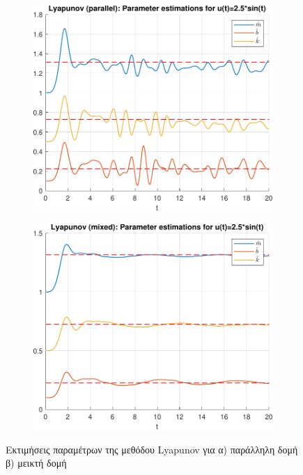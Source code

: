 \documentclass[a4paper,12pt]{article}
\begin{document}
\begin{figure}[h!]
    \centering
    \begin{subfigure}{0.45\textwidth}
        \centering
        \includegraphics[width=\linewidth]{plot/task1_parameter_estimations_lyapunov_parallel.pdf}
        \caption{}
        \label{fig:task1_parameter_estimations_lyapunov_parallel}
    \end{subfigure}
    \hfill
    \begin{subfigure}{0.45\textwidth}
        \centering
        \includegraphics[width=\linewidth]{plot/task1_parameter_estimations_lyapunov_mixed.pdf}
        \caption{}
        \label{fig:task1_parameter_estimations_lyapunov_mixed}
    \end{subfigure}
    \caption{Εκτιμήσεις παραμέτρων της μεθόδου Lyapunov για 
    α) παράλληλη δομή β) μεικτή δομή}
    \label{fig:task1_parameter_estimations_lyapunov}
\end{figure}
\end{document}

